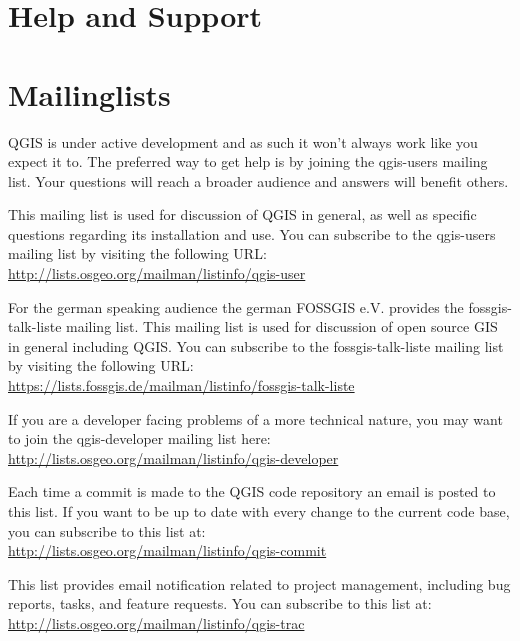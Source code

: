 
\section{Help and Support}\label{label_helpsupport}


\section{Mailinglists}
QGIS is under active development and as such it won't always work like
you expect it to. The preferred way to get help is by joining the qgis-users
mailing list. Your questions will reach a broader audience and answers will
benefit others. 

This mailing list is used for discussion of QGIS in general, as well as
specific questions regarding its installation and use. You can subscribe to
the qgis-users mailing list by visiting the following URL: \\
\url{http://lists.osgeo.org/mailman/listinfo/qgis-user}

For the german speaking audience the german FOSSGIS e.V. provides the
fossgis-talk-liste mailing list. This mailing list is used for discussion of
open source GIS in general including QGIS. You can subscribe to the
fossgis-talk-liste mailing list by visiting the following URL: \\
\url{https://lists.fossgis.de/mailman/listinfo/fossgis-talk-liste}

If you are a developer facing problems of a more technical nature, you may
want to join the qgis-developer mailing list here:\\
\url{http://lists.osgeo.org/mailman/listinfo/qgis-developer}

Each time a commit is made to the QGIS code repository an email is posted to
this list. If you want to be up to date with every change to the current code
base, you can subscribe to this list at:\\
\url{http://lists.osgeo.org/mailman/listinfo/qgis-commit}

This list provides email notification related to project management,
including bug reports, tasks, and feature requests. You can subscribe to this
list at:\\
\url{http://lists.osgeo.org/mailman/listinfo/qgis-trac}

